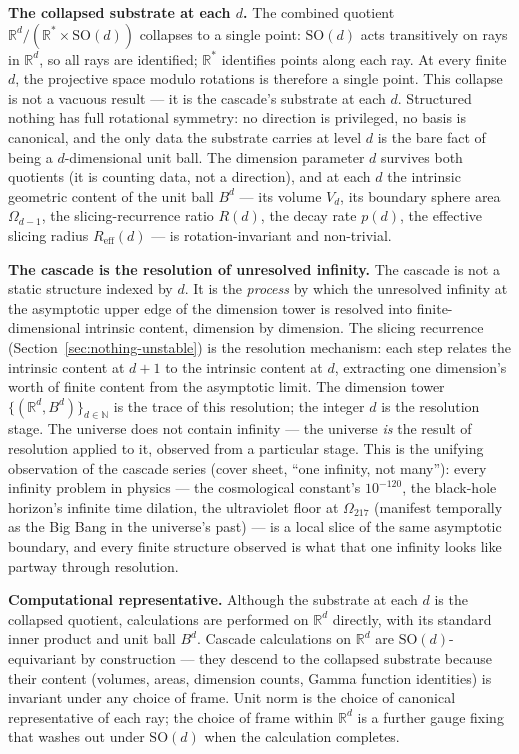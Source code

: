 \documentclass[11pt,a4paper]{article}
\begin{document}
\noindent\textbf{The collapsed substrate at each $d$.} The combined
quotient $\mathbb{R}^d/(\mathbb{R}^*\times\mathrm{SO}(d))$ collapses to
a single point: $\mathrm{SO}(d)$ acts transitively on rays in
$\mathbb{R}^d$, so all rays are identified; $\mathbb{R}^*$ identifies
points along each ray. At every finite $d$, the projective space modulo
rotations is therefore a single point. This collapse is not a vacuous
result --- it is the cascade's substrate at each $d$. Structured
nothing has full rotational symmetry: no direction is privileged, no
basis is canonical, and the only data the substrate carries at level
$d$ is the bare fact of being a $d$-dimensional unit ball. The
dimension parameter $d$ survives both quotients (it is counting data,
not a direction), and at each $d$ the intrinsic geometric content of
the unit ball $B^d$ --- its volume $V_d$, its boundary sphere area
$\Omega_{d-1}$, the slicing-recurrence ratio $R(d)$, the decay rate
$p(d)$, the effective slicing radius $R_{\mathrm{eff}}(d)$ --- is
rotation-invariant and non-trivial.

\noindent\textbf{The cascade is the resolution of unresolved infinity.}
The cascade is not a static structure indexed by $d$. It is the
\emph{process} by which the unresolved infinity at the asymptotic
upper edge of the dimension tower is resolved into finite-dimensional
intrinsic content, dimension by dimension. The slicing recurrence
(Section~\ref{sec:nothing-unstable}) is the resolution mechanism:
each step relates the intrinsic content at $d+1$ to the intrinsic
content at $d$, extracting one dimension's worth of finite content
from the asymptotic limit. The dimension tower
$\{(\mathbb{R}^d, B^d)\}_{d\in\mathbb{N}}$ is the trace of this
resolution; the integer $d$ is the resolution stage. The universe
does not contain infinity --- the universe \emph{is} the result of
resolution applied to it, observed from a particular stage. This is
the unifying observation of the cascade series (cover sheet, ``one
infinity, not many''): every infinity problem in physics --- the
cosmological constant's $10^{-120}$, the black-hole horizon's
infinite time dilation, the ultraviolet floor at $\Omega_{217}$
(manifest temporally as the Big Bang in the universe's past) --- is a
local slice of the same asymptotic boundary, and every finite
structure observed is what that one infinity looks like partway
through resolution.

\noindent\textbf{Computational representative.} Although the substrate
at each $d$ is the collapsed quotient, calculations are performed on
$\mathbb{R}^d$ directly, with its standard inner product and unit ball
$B^d$. Cascade calculations on $\mathbb{R}^d$ are
$\mathrm{SO}(d)$-equivariant by construction --- they descend to the
collapsed substrate because their content (volumes, areas, dimension
counts, Gamma function identities) is invariant under any choice of
frame. Unit norm is the choice of canonical representative of each
ray; the choice of frame within $\mathbb{R}^d$ is a further gauge
fixing that washes out under $\mathrm{SO}(d)$ when the calculation
completes.
\end{document}

